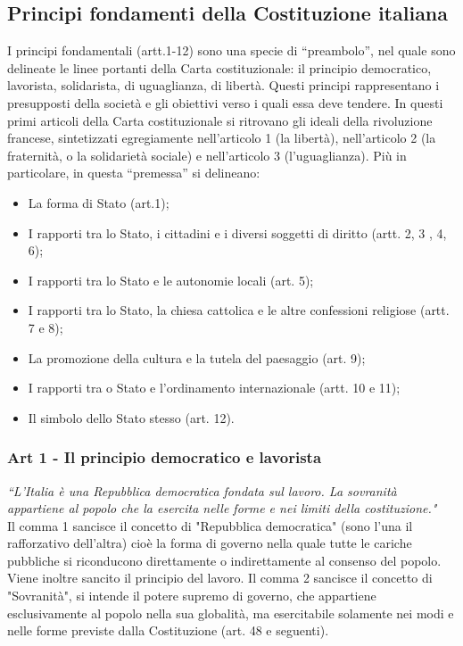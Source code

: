 \documentclass{report}
\begin{document}
\subsection{Principi fondamenti della Costituzione italiana}

I principi fondamentali (artt.1-12) sono una specie di “preambolo”, nel quale sono delineate le linee portanti della Carta
costituzionale: il principio democratico, lavorista, solidarista, di uguaglianza, di libertà.
Questi principi rappresentano i presupposti della società e gli obiettivi verso i quali essa deve tendere.
In questi primi articoli della Carta costituzionale si ritrovano gli ideali della rivoluzione francese, sintetizzati
egregiamente nell’articolo 1 (la libertà), nell’articolo 2 (la fraternità, o la solidarietà sociale) e nell’articolo 3
(l’uguaglianza).
Più in particolare, in questa “premessa” si delineano:

\begin{itemize}
  \item La forma di Stato (art.1);
  \item I rapporti tra lo Stato, i cittadini e i diversi soggetti di diritto (artt. 2, 3 , 4, 6);
  \item I rapporti tra lo Stato e le autonomie locali (art. 5);
  \item I rapporti tra lo Stato, la chiesa cattolica e le altre confessioni religiose (artt. 7 e 8);
  \item La promozione della cultura e la tutela del paesaggio (art. 9);
  \item I rapporti tra o Stato e l’ordinamento internazionale (artt. 10 e 11);
  \item Il simbolo dello Stato stesso (art. 12).
\end{itemize}

\subsubsection{Art 1 - Il principio democratico e lavorista}
\textit{“L’Italia è una Repubblica democratica fondata sul lavoro.
La sovranità appartiene al popolo che la esercita nelle forme e nei limiti della costituzione."}
\\
Il comma 1 sancisce il concetto di "Repubblica democratica" (sono l’una il rafforzativo dell’altra) cioè la forma di
governo nella quale tutte le cariche pubbliche si riconducono direttamente o indirettamente al consenso del popolo.
Viene inoltre sancito il principio del lavoro.
Il comma 2 sancisce il concetto di "Sovranità", si intende il potere supremo di governo, che appartiene esclusivamente
al popolo nella sua globalità, ma esercitabile solamente nei modi e nelle forme previste dalla Costituzione (art. 48 e
seguenti).
\end{document}
